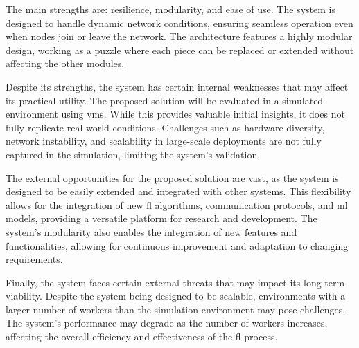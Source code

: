 The main strengths are: resilience, modularity, and ease of use. The system is designed to handle dynamic network conditions, ensuring seamless operation even when nodes join or leave the network. The architecture features a highly modular design, working as a puzzle where each piece can be replaced or extended without affecting the other modules. 

Despite its strengths, the system has certain internal weaknesses that may affect its practical utility. The proposed solution will be evaluated in a simulated environment using \acp{vm}. While this provides valuable initial insights, it does not fully replicate real-world conditions. Challenges such as hardware diversity, network instability, and scalability in large-scale deployments are not fully captured in the simulation, limiting the system's validation.

The external opportunities for the proposed solution are vast, as the system is designed to be easily extended and integrated with other systems. This flexibility allows for the integration of new \ac{fl} algorithms, communication protocols, and \ac{ml} models, providing a versatile platform for research and development. The system's modularity also enables the integration of new features and functionalities, allowing for continuous improvement and adaptation to changing requirements.

Finally, the system faces certain external threats that may impact its long-term viability. Despite the system being designed to be scalable, environments with a larger number of workers than the simulation environment may pose challenges. The system's performance may degrade as the number of workers increases, affecting the overall efficiency and effectiveness of the \ac{fl} process. 

